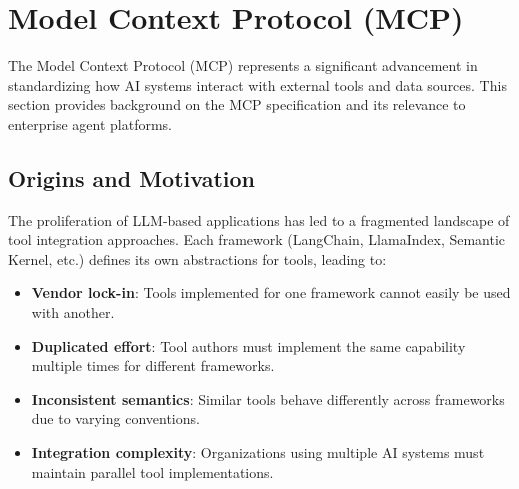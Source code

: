 %
%

\section{Model Context Protocol (MCP)}
\label{sec:mcp-background}

The Model Context Protocol (MCP) represents a significant advancement in standardizing how AI systems interact with external tools and data sources. This section provides background on the MCP specification and its relevance to enterprise agent platforms.

\subsection{Origins and Motivation}

The proliferation of LLM-based applications has led to a fragmented landscape of tool integration approaches. Each framework (LangChain, LlamaIndex, Semantic Kernel, etc.) defines its own abstractions for tools, leading to:

\begin{itemize}
    \item \textbf{Vendor lock-in}: Tools implemented for one framework cannot easily be used with another.
    \item \textbf{Duplicated effort}: Tool authors must implement the same capability multiple times for different frameworks.
    \item \textbf{Inconsistent semantics}: Similar tools behave differently across frameworks due to varying conventions.
    \item \textbf{Integration complexity}: Organizations using multiple AI systems must maintain parallel tool implementations.
\end{itemize}

